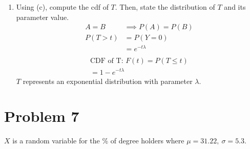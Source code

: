 \documentclass{article}
\begin{document}
\begin{enumerate}[label=\alph*)]
\begin{description}
          \end{description}
    \item Using (c), compute the cdf of \(T\). Then, state the distribution of \(T\) and its parameter value.
          \begin{align*}
              A = B    & \implies P(A) = P(B) \\
              P(T > t) & =  P(Y = 0)          \\
                       & = e^{-t\lambda}      \\
          \end{align*}
          \begin{align*}
              \text{CDF of T: } F(t) =  P(T \leq t) \\
              = 1 - e^{-t\lambda}
          \end{align*}
          \(T\) represents an exponential distribution with parameter \(\lambda\).
\end{enumerate}

\pagebreak

\section*{Problem 7}
\(X\) is a random variable for the \% of degree holders where \(\mu = 31.22,\ \sigma = 5.3\).
\end{document}
